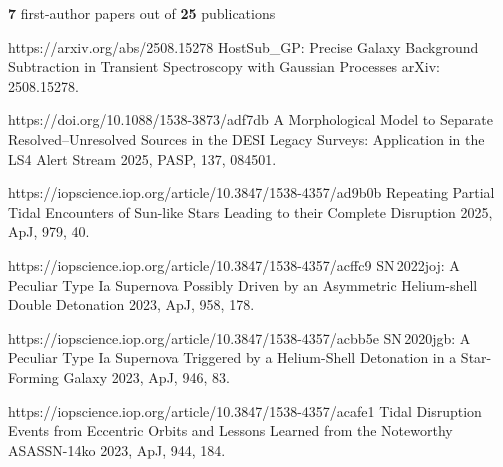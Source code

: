 


\begin{cvpubs}

\cvpub
{ %
{\bf 7} first-author papers out of {\bf 25} publications
}


\begin{cvpubitems}

{}
{https://arxiv.org/abs/2508.15278}
{HostSub\_GP: Precise Galaxy Background Subtraction in Transient Spectroscopy with Gaussian Processes}
{arXiv: 2508.15278.}

{}
{https://doi.org/10.1088/1538-3873/adf7db}
{A Morphological Model to Separate Resolved--Unresolved Sources in the DESI Legacy Surveys: Application in the LS4 Alert Stream}
{2025, PASP, 137, 084501.}

{}
{https://iopscience.iop.org/article/10.3847/1538-4357/ad9b0b}
{Repeating Partial Tidal Encounters of Sun-like Stars Leading to their Complete Disruption}
{2025, ApJ, 979, 40.}

{}
{https://iopscience.iop.org/article/10.3847/1538-4357/acffc9}
{SN\,2022joj: A Peculiar Type Ia Supernova Possibly Driven by an Asymmetric Helium-shell Double Detonation}
{2023, ApJ, 958, 178.}

{}
{https://iopscience.iop.org/article/10.3847/1538-4357/acbb5e}
{SN\,2020jgb: A Peculiar Type Ia Supernova Triggered by a Helium-Shell Detonation in a Star-Forming Galaxy}
{2023, ApJ, 946, 83.}

{}
{https://iopscience.iop.org/article/10.3847/1538-4357/acafe1}
{Tidal Disruption Events from Eccentric Orbits and Lessons Learned from the Noteworthy ASASSN-14ko}
{2023, ApJ, 944, 184.}


\end{cvpubitems}
\end{cvpubs}
